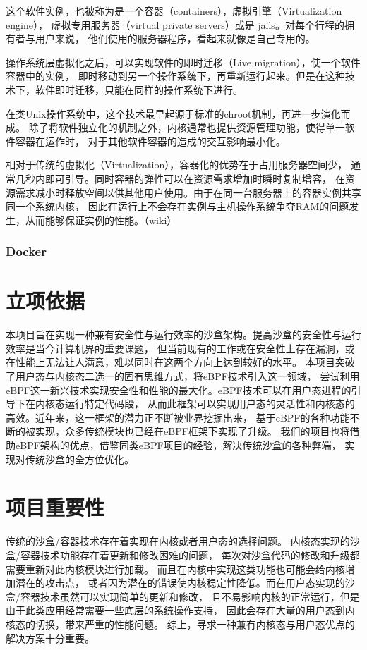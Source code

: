 \documentclass[AutoFakeBold,a4paper]{ctexart}
\begin{document}
这个软件实例，也被称为是一个容器（containers），虚拟引擎（Virtualization engine），
虚拟专用服务器（virtual private servers）或是 jails。对每个行程的拥有者与用户来说，
他们使用的服务器程序，看起来就像是自己专用的。

操作系统层虚拟化之后，可以实现软件的即时迁移（Live migration），使一个软件容器中的实例，
即时移动到另一个操作系统下，再重新运行起来。但是在这种技术下，软件即时迁移，只能在同样的操作系统下进行。

在类Unix操作系统中，这个技术最早起源于标准的chroot机制，再进一步演化而成。
除了将软件独立化的机制之外，内核通常也提供资源管理功能，使得单一软件容器在运作时，
对于其他软件容器的造成的交互影响最小化。

相对于传统的虚拟化（Virtualization），容器化的优势在于占用服务器空间少，
通常几秒内即可引导。同时容器的弹性可以在资源需求增加时瞬时复制增容，
在资源需求减小时释放空间以供其他用户使用。由于在同一台服务器上的容器实例共享同一个系统内核，
因此在运行上不会存在实例与主机操作系统争夺RAM的问题发生，从而能够保证实例的性能。（wiki）
\subsubsection{Docker}


\section{立项依据}

本项目旨在实现一种兼有安全性与运行效率的沙盒架构。提高沙盒的安全性与运行效率是当今计算机界的重要课题，
但当前现有的工作或在安全性上存在漏洞，或在性能上无法让人满意，难以同时在这两个方向上达到较好的水平。
本项目突破了用户态与内核态二选一的固有思维方式，将eBPF技术引入这一领域，
尝试利用eBPF这一新兴技术实现安全性和性能的最大化。eBPF技术可以在用户态进程的引导下在内核态运行特定代码段，
从而此框架可以实现用户态的灵活性和内核态的高效。近年来，这一框架的潜力正不断被业界挖掘出来，
基于eBPF的各种功能不断的被实现，众多传统模块也已经在eBPF框架下实现了升级。
我们的项目也将借助eBPF架构的优点，借鉴同类eBPF项目的经验，解决传统沙盒的各种弊端，
实现对传统沙盒的全方位优化。

\section{项目重要性}

传统的沙盒/容器技术存在着实现在内核或者用户态的选择问题。
内核态实现的沙盒/容器技术功能存在着更新和修改困难的问题，
每次对沙盒代码的修改和升级都需要重新对此内核模块进行加载。
而且在内核中实现这类功能也可能会给内核增加潜在的攻击点，
或者因为潜在的错误使内核稳定性降低。而在用户态实现的沙盒/容器技术虽然可以实现简单的更新和修改，
且不易影响内核的正常运行，但是由于此类应用经常需要一些底层的系统操作支持，
因此会存在大量的用户态到内核态的切换，带来严重的性能问题。
综上，寻求一种兼有内核态与用户态优点的解决方案十分重要。
\end{document}
